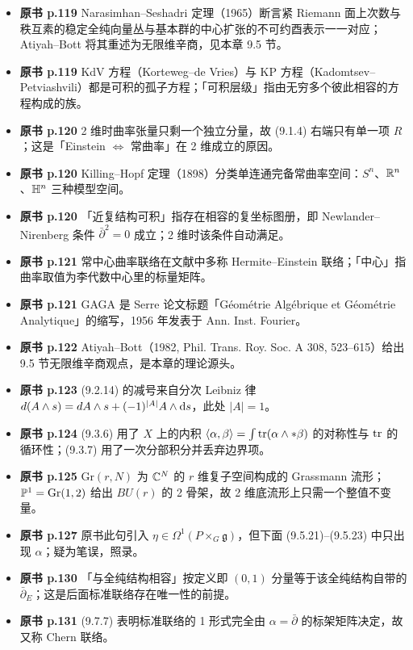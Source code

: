 \begin{itemize}[leftmargin=2.4em,itemsep=4pt,label={\textbullet}]
\item \textbf{原书 p.119} Narasimhan–Seshadri 定理（1965）断言紧 Riemann 面上次数与秩互素的稳定全纯向量丛与基本群的中心扩张的不可约酉表示一一对应；Atiyah–Bott 将其重述为无限维辛商，见本章 9.5 节。
\item \textbf{原书 p.119} KdV 方程（Korteweg–de Vries）与 KP 方程（Kadomtsev–Petviashvili）都是可积的孤子方程；「可积层级」指由无穷多个彼此相容的方程构成的族。
\item \textbf{原书 p.120} 2 维时曲率张量只剩一个独立分量，故 (9.1.4) 右端只有单一项 $R$；这是「Einstein $\Longleftrightarrow$ 常曲率」在 2 维成立的原因。
\item \textbf{原书 p.120} Killing–Hopf 定理（1898）分类单连通完备常曲率空间：$S^n$、$\mathbb{R}^n$、$\mathbb{H}^n$ 三种模型空间。
\item \textbf{原书 p.120} 「近复结构可积」指存在相容的复坐标图册，即 Newlander–Nirenberg 条件 $\bar\partial^2=0$ 成立；2 维时该条件自动满足。
\item \textbf{原书 p.121} 常中心曲率联络在文献中多称 Hermite–Einstein 联络；「中心」指曲率取值为李代数中心里的标量矩阵。
\item \textbf{原书 p.121} GAGA 是 Serre 论文标题「Géométrie Algébrique et Géométrie Analytique」的缩写，1956 年发表于 Ann. Inst. Fourier。
\item \textbf{原书 p.122} Atiyah–Bott（1982, Phil. Trans. Roy. Soc. A 308, 523–615）给出 9.5 节无限维辛商观点，是本章的理论源头。
\item \textbf{原书 p.123} (9.2.14) 的减号来自分次 Leibniz 律 $d(A\wedge s)=dA\wedge s+(-1)^{|A|}A\wedge \mathrm{d} s$，此处 $|A|=1$。
\item \textbf{原书 p.124} (9.3.6) 用了 $X$ 上的内积 $\langle\alpha,\beta\rangle=\int\operatorname{tr}(\alpha\wedge*\beta)$ 的对称性与 $\operatorname{tr}$ 的循环性；(9.3.7) 用了一次分部积分并丢弃边界项。
\item \textbf{原书 p.125} $\mathrm{Gr}(r,N)$ 为 $\mathbb{C}^N$ 的 $r$ 维复子空间构成的 Grassmann 流形；$\mathbb{P}^1=\mathrm{Gr}(1,2)$ 给出 $BU(r)$ 的 2 骨架，故 2 维底流形上只需一个整值不变量。
\item \textbf{原书 p.127} 原书此句引入 $\eta\in\Omega^1(P\times_G\mathfrak g)$，但下面 (9.5.21)–(9.5.23) 中只出现 $\alpha$；疑为笔误，照录。
\item \textbf{原书 p.130} 「与全纯结构相容」按定义即 $(0,1)$ 分量等于该全纯结构自带的 $\bar\partial_E$；这是后面标准联络存在唯一性的前提。
\item \textbf{原书 p.131} (9.7.7) 表明标准联络的 1 形式完全由 $\alpha=\bar\partial$ 的标架矩阵决定，故又称 Chern 联络。

\end{itemize}
